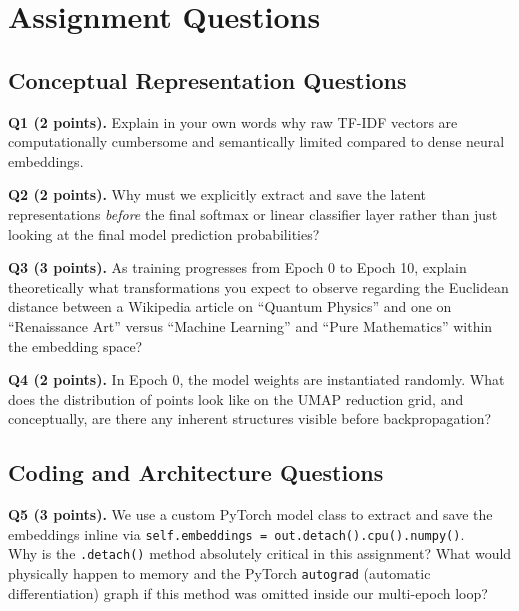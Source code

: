 \documentclass[11pt]{article}
\begin{document}
\clearpage
\section{Assignment Questions}

\subsection{Conceptual Representation Questions}

\textbf{Q1 (2 points).} Explain in your own words why raw TF-IDF vectors are computationally cumbersome and semantically limited compared to dense neural embeddings. 

\vspace{4cm}

\textbf{Q2 (2 points).} Why must we explicitly extract and save the latent representations \textit{before} the final softmax or linear classifier layer rather than just looking at the final model prediction probabilities?

\vspace{4cm}

\textbf{Q3 (3 points).} As training progresses from Epoch 0 to Epoch 10, explain theoretically what transformations you expect to observe regarding the Euclidean distance between a Wikipedia article on ``Quantum Physics'' and one on ``Renaissance Art'' versus ``Machine Learning'' and ``Pure Mathematics'' within the embedding space?

\vspace{4cm}

\textbf{Q4 (2 points).} In Epoch 0, the model weights are instantiated randomly. What does the distribution of points look like on the UMAP reduction grid, and conceptually, are there any inherent structures visible before backpropagation?

\vspace{4cm}

\subsection{Coding and Architecture Questions}

\textbf{Q5 (3 points).} We use a custom PyTorch model class to extract and save the embeddings inline via \texttt{self.embeddings = out.detach().cpu().numpy()}. \\
Why is the \texttt{.detach()} method absolutely critical in this assignment? What would physically happen to memory and the PyTorch \texttt{autograd} (automatic differentiation) graph if this method was omitted inside our multi-epoch loop?
\end{document}
